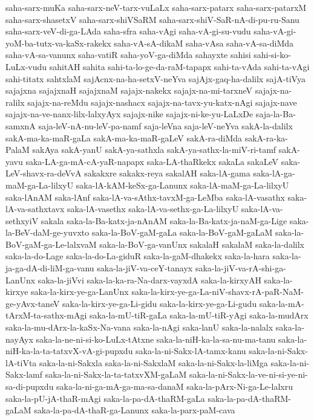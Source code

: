 {saha-sarx-muKa
saha-sarx-neV-tarx-vuLaLx
saha-sarx-patarx
saha-sarx-patarxM
saha-sarx-shasetxV
saha-sarx-shiVSaRM
saha-sarx-shiV-SaR-nA-di-pu-ru-Sanu
saha-sarx-veV-di-ga-LAda
saha-sfra
saha-vAgi
saha-vA-gi-su-vudu
saha-vA-gi-yoM-ba-tutx-va-kaSx-rakekx
saha-vA-sA-dikaM
saha-vAsa
saha-vA-sa-diMda
saha-vA-sa-vanunx
saha-vatiR
saha-yoV-ga-diMda
sahayxte
sahisi
sahi-si-ko-LuLx-vudu
sahitAH
sahita
sahi-ta-lo-ge-da-raM-tapapx
sahi-ta-vAda
sahi-ta-vAgi
sahi-titatx
sahtxlaM
sajAcnx-na-ha-setxV-neYva
sajAjx-gaq-ha-dalilx
sajA-tiVya
sajajxna
sajajxnaH
sajajxnaM
sajajx-nakekx
sajajx-na-mi-tarxneV
sajajx-na-ralilx
sajajx-na-reMdu
sajajx-nashacx
sajajx-na-tavx-yu-katx-nAgi
sajajx-nave
sajajx-na-ve-nanx-lilx-lalxyAyx
sajajx-nike
sajajx-ni-ke-yu-LaLxDe
saja-la-Ba-samxnA
saja-leV-nA-nu-leV-pa-namf
saja-leVna
saja-leV-neYva
sakA-la-dalilx
sakA-ma-ka-maR-gaLa
sakA-ma-ka-maR-gaLeV
sakA-ra-diMda
sakA-ra-ka-PalaM
sakAya
sakA-yanU
sakA-ya-sathxla
sakA-ya-sathx-la-miV-ri-tamf
sakA-yavu
saka-LA-ga-mA-cA-yaR-napapx
saka-LA-thaRkekx
sakaLa
sakaLeV
saka-LeV-shavx-ra-deVvA
sakakxre
sakakx-reya
sakalAH
saka-lA-gama
saka-lA-ga-maM-ga-La-lilxyU
saka-lA-kAM-keSx-ga-Lanunx
saka-lA-maM-ga-La-lilxyU
saka-lAnAM
saka-lAnf
saka-lA-va-sAthx-tavxM-ga-LeMba
saka-lA-vasathx
saka-lA-va-sathxtavx
saka-lA-vasethx
saka-lA-va-sethx-ga-La-lilxyU
saka-lA-va-sethxyiV
sakala
saka-la-Ba-katx-ja-nAnAM
saka-la-Ba-katx-ja-naM-ga-Lige
saka-la-BeV-daM-ge-yuvxto
saka-la-BoV-gaM-gaLa
saka-la-BoV-gaM-gaLaM
saka-la-BoV-gaM-ga-Le-lalxvaM
saka-la-BoV-ga-vanUnx
sakalaH
sakalaM
saka-la-dalilx
saka-la-do-Lage
saka-la-do-La-giduR
saka-la-gaM-dhakekx
saka-la-hara
saka-la-ja-ga-dA-di-liM-ga-vanu
saka-la-jiV-va-ceY-tanayx
saka-la-jiV-va-rA-shi-ga-LanUnx
saka-la-jiVvi
saka-la-ka-ra-Na-darx-vayxdA
saka-la-kirxyAH
saka-la-kirxye
saka-la-kirx-ye-ga-LanUnx
saka-la-kirx-ye-ga-La-niV-shavx-rA-paR-NaM-ge-yAvx-taneV
saka-la-kirx-ye-ga-Li-gidu
saka-la-kirx-ye-ga-Li-gudu
saka-la-mA-tArxM-ta-sathx-mAgi
saka-la-mU-tiR-gaLa
saka-la-mU-tiR-yAgi
saka-la-mudArx
saka-la-mu-dArx-la-kaSx-Na-vana
saka-la-nAgi
saka-lanU
saka-la-nalalx
saka-la-nayAyx
saka-la-ne-ni-si-ko-LuLx-tAtxne
saka-la-niH-ka-la-sa-nu-ma-tanu
saka-la-niH-ka-la-ta-tatxvX-vA-gi-pupxdu
saka-la-ni-Sakx-lA-tamx-kanu
saka-la-ni-Sakx-lA-tiVta
saka-la-ni-Sakxla
saka-la-ni-SakxlaM
saka-la-ni-Sakx-la-liMga
saka-la-ni-Sakx-lamf
saka-la-ni-Sakx-la-ta-tatxvXM-gaLaM
saka-la-ni-Sakx-la-ve-ni-si-ye-ni-sa-di-pupxdu
saka-la-ni-ga-mA-ga-ma-sa-danaM
saka-la-pArx-Ni-ga-Le-lalxru
saka-la-pU-jA-thaR-mAgi
saka-la-pa-dA-thaRM-gaLa
saka-la-pa-dA-thaRM-gaLaM
saka-la-pa-dA-thaR-ga-Lanunx
saka-la-parx-paM-cava
}

